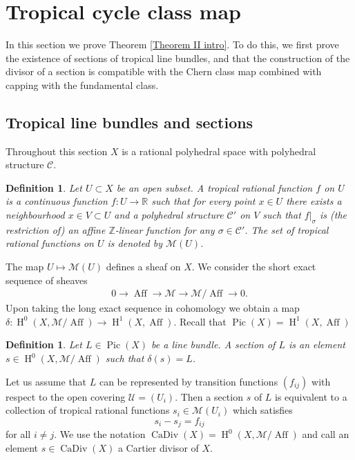 \documentclass[11pt]{article}
\numberwithin{equation}{numsection}
\newcommand{\Z}{{\mathbb Z}}
\newcommand{\CC}{{\mathcal C}}
\newcommand{\R}{{\mathbb R}}
\newcommand{\US}{\mathcal{U}}
\newcommand{\MS}{\mathcal{M}}
\DeclareMathOperator{\Pic}{Pic}
\DeclareMathOperator{\Aff}{Aff}
\DeclareMathOperator{\Div}{CaDiv}
\DeclareMathOperator{\HH}{H}
\newtheorem{definition}[thm]{Definition}
\begin{document}
\section{Tropical cycle class map}

In this section we prove Theorem \ref{Theorem II intro}.  
To do this,  we  first prove the existence of sections of tropical line bundles, 
and that the  construction of the divisor of a section is compatible with the Chern class map combined with capping
with the fundamental class.

\subsection{Tropical line bundles and sections}


Throughout this section $X$ is a rational polyhedral space 
with polyhedral structure $\CC$. 


\begin{definition}
	Let $U \subset X$ be an open subset. 
	A \emph{tropical rational  function} $f$ on $U$
	is  a continuous function $f \colon U \to \R$ such that
	for every point $x \in U$ there exists a neighbourhood
	$x \in V \subset U$ and a polyhedral structure $\CC'$
	on $V$ such that 
	$f|_{\sigma}$ is (the restriction of) an affine $\Z$-linear function
	for any $\sigma \in \CC'$. 
	The set of tropical rational functions on $U$
	is denoted by $\MS(U)$.
\end{definition}


The map $U \mapsto \MS(U)$ defines a sheaf on $X$. 
We consider the short exact sequence of sheaves
\begin{align*}
0 \to \Aff \to \MS \to \MS / \Aff \to 0.
\end{align*}
Upon taking the long exact sequence in cohomology we obtain a map 
$\delta \colon \HH^0(X, \MS/\Aff) \to \HH^1(X,\Aff)$.
Recall that $\Pic(X) =\HH^1(X,\Aff)$

\begin{definition}\label{def:section}
  Let $L \in \Pic(X)$ be a line bundle.
	A \emph{section} of $L$ is an element $s \in \HH^0(X, \MS/\Aff)$ such that $\delta(s) = L$.
\end{definition}

  Let us assume that $L$ can be represented 
	by transition functions $(f_{ij})$ with respect to the open covering 
	$\US = (U_i)$. 
	Then a section $s$ of $L$ is equivalent to a collection of tropical rational functions
	$s_i \in \MS(U_i)$ which satisfies
	\[
		s_i - s_j = f_{ij}
	\]
	for all $i \neq j$. 
We use the notation $\Div(X) 	= \HH^0(X, \MS/\Aff)$ and call an element $s \in \Div(X)$
a Cartier divisor of $X$. 
\end{document}

